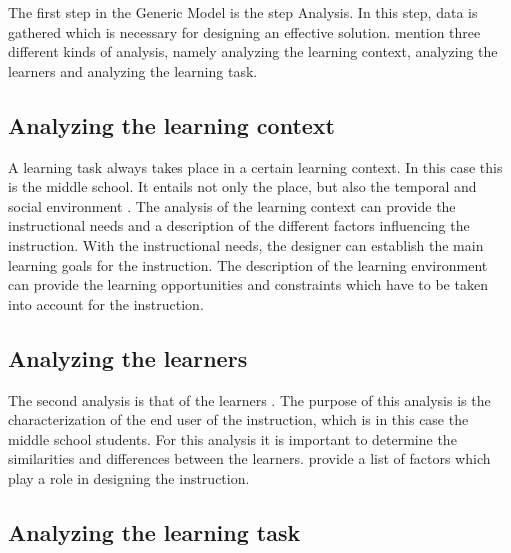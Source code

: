 \documentclass[12pt]{report} %
\begin{document}
The first step in the Generic Model \cite{genericmodel} is the step Analysis. In this step, data is gathered which is necessary for designing an effective solution.  mention three different kinds of analysis, namely analyzing the learning context, analyzing the learners and analyzing the learning task.

\subsection{Analyzing the learning context}

A learning task always takes place in a certain learning context. In this case this is the middle school. It entails not only the place, but also the temporal and social environment \cite{smithragan}. The analysis of the learning context can provide the instructional needs and a description of the different factors influencing the instruction. With the instructional needs, the designer can establish the main learning goals for the instruction. The description of the learning environment can provide the learning opportunities and constraints which have to be taken into account for the instruction.

\subsection{Analyzing the learners}

The second analysis is that of the learners \cite{smithragan}. The purpose of this analysis is the characterization of the end user of the instruction, which is in this case the middle school students. For this analysis it is important to determine the similarities and differences between the learners.  provide a list of factors which play a role in designing the instruction.

\subsection{Analyzing the learning task}
\end{document}
